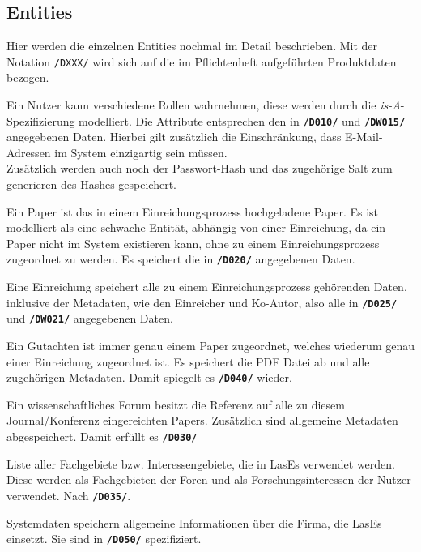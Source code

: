 \subsection{Entities}

Hier werden die einzelnen Entities nochmal im Detail beschrieben. Mit der Notation \texttt{/DXXX/} wird sich auf die im Pflichtenheft aufgeführten Produktdaten bezogen.

\begin{description}
	 Ein Nutzer kann verschiedene Rollen wahrnehmen, diese werden durch die \emph{is-A}-Spezifizierung modelliert. Die Attribute entsprechen den in \texttt{\textbf{/D010/}} und \texttt{\textbf{/DW015/}} angegebenen Daten. Hierbei gilt zusätzlich die Einschränkung, dass E-Mail-Adressen im System einzigartig sein müssen. \\Zusätzlich werden auch noch der Passwort-Hash und das zugehörige Salt zum generieren des Hashes gespeichert.

	 Ein Paper ist das in einem Einreichungsprozess hochgeladene Paper. Es ist modelliert als eine schwache Entität, abhängig von einer Einreichung, da ein Paper nicht im System existieren kann, ohne zu einem Einreichungsprozess zugeordnet zu werden. Es speichert die in \texttt{\textbf{/D020/}} angegebenen Daten.

	 Eine Einreichung speichert alle zu einem Einreichungsprozess gehörenden Daten, inklusive der Metadaten, wie den Einreicher und Ko-Autor, also alle in \texttt{\textbf{/D025/}} und \texttt{\textbf{/DW021/}} angegebenen Daten.

	 Ein Gutachten ist immer genau einem Paper zugeordnet, welches wiederum genau einer Einreichung zugeordnet ist. Es speichert die PDF Datei ab und alle zugehörigen Metadaten.
	Damit spiegelt es \texttt{\textbf{/D040/}} wieder.

	 Ein wissenschaftliches Forum besitzt die Referenz auf alle zu diesem Journal/Konferenz eingereichten Papers. Zusätzlich sind allgemeine Metadaten abgespeichert. Damit erfüllt es \texttt{\textbf{/D030/}}

	 Liste aller Fachgebiete bzw. Interessengebiete, die in LasEs verwendet werden. Diese werden als Fachgebieten der Foren und als Forschungsinteressen der Nutzer verwendet. Nach \texttt{\textbf{/D035/}}.

	 Systemdaten speichern allgemeine Informationen über die Firma, die LasEs einsetzt. Sie sind in \texttt{\textbf{/D050/}} spezifiziert.

\end{description}
